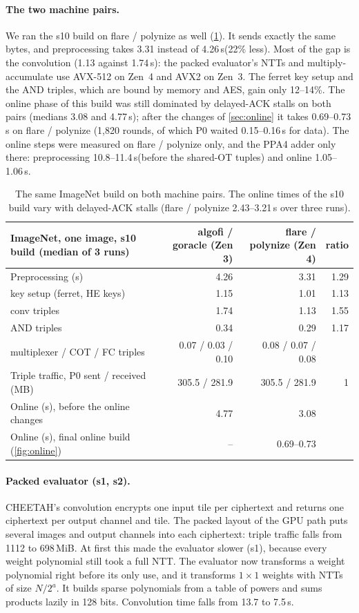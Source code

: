 \documentclass[10pt,a4paper]{article}
\newcommand{\s}{\,s\xspace}
\begin{document}
\paragraph{The two machine pairs.} We ran the s10 build on flare / polynize as well (\cref{tab:pairs}). It sends exactly the
same bytes, and preprocessing takes 3.31 instead of 4.26\s (22\% less). Most of the gap is the convolution
(1.13 against 1.74\s): the packed evaluator's NTTs and multiply-accumulate use AVX-512 on Zen~4 and AVX2 on Zen~3. The ferret key
setup and the AND triples, which are bound by memory and AES, gain only 12--14\%. The online phase of this build was still
dominated by delayed-ACK stalls on both pairs (medians 3.08 and 4.77\s); after the changes of \cref{sec:online} it takes
0.69--0.73\s on flare / polynize (1,820 rounds, of which P0 waited 0.15--0.16\s for data). The online steps were measured on flare
/ polynize only, and the PPA4 adder only there: preprocessing 10.8--11.4\s (before the shared-OT tuples) and online 1.05--1.06\s.

\begin{table}[t]
\centering\small
\begin{tabular}{@{}lrrr@{}}
\toprule
ImageNet, one image, s10 build (median of 3 runs) & algofi / goracle (Zen 3) & flare / polynize (Zen 4) & ratio\\
\midrule
Preprocessing (s) & 4.26 & 3.31 & 1.29\\
\quad key setup (ferret, HE keys) & 1.15 & 1.01 & 1.13\\
\quad conv triples & 1.74 & 1.13 & 1.55\\
\quad AND triples & 0.34 & 0.29 & 1.17\\
\quad multiplexer / COT / FC triples & 0.07 / 0.03 / 0.10 & 0.08 / 0.07 / 0.08 & \\
Triple traffic, P0 sent / received (MB) & 305.5 / 281.9 & 305.5 / 281.9 & 1\\
Online (s), before the online changes & 4.77 & 3.08 & \\
Online (s), final online build (\cref{fig:online}) & -- & 0.69--0.73 & \\
\bottomrule
\end{tabular}
\caption{The same ImageNet build on both machine pairs. The online times of the s10 build vary with delayed-ACK stalls
(flare / polynize 2.43--3.21\s over three runs).}
\label{tab:pairs}
\end{table}

\paragraph{Packed evaluator (s1, s2).} CHEETAH's convolution encrypts one input tile per ciphertext and
returns one ciphertext per output channel and tile. The packed layout of the GPU path puts several images
and output channels into each ciphertext: triple traffic falls from 1112 to 698\,MiB. At first this made the evaluator
slower (s1), because every weight polynomial still took a full NTT. The evaluator now transforms a weight
polynomial right before its only use, and it transforms $1\times1$ weights with NTTs of size
$N/2^a$. It builds sparse polynomials from a table of powers and sums products lazily in 128 bits.
Convolution time falls from 13.7 to 7.5\s.
\end{document}
